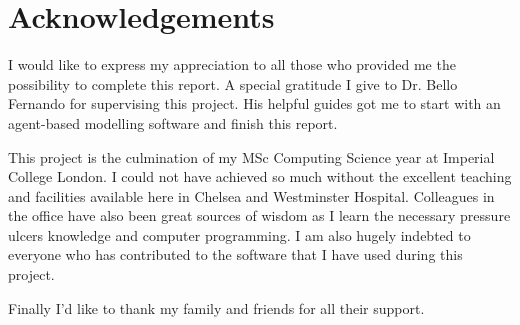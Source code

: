 \section*{Acknowledgements}

I would like to express my appreciation to all those who provided me the possibility to complete this report. A special gratitude I give to Dr. Bello Fernando for supervising this project. His helpful guides got me to start with an agent-based modelling software and finish this report.

This project is the culmination of my MSc Computing Science year at Imperial College London. I could not have achieved so much without the excellent teaching and facilities available here in Chelsea and Westminster Hospital. Colleagues in the office have also been great sources of wisdom as I learn the necessary pressure ulcers knowledge and computer programming. I am also hugely indebted to everyone who has contributed to the software that I have used during this project.

Finally I'd like to thank my family and friends for all their support.